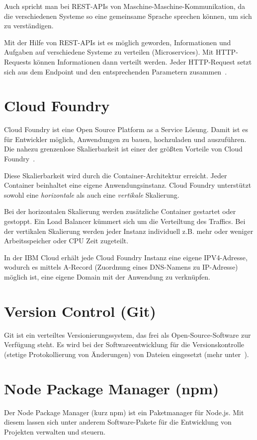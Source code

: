 Auch spricht man bei REST-APIs von Maschine-Maschine-Kommunikation, da die verschiedenen Systeme so eine gemeinsame
Sprache sprechen können, um sich zu verständigen.

Mit der Hilfe von REST-APIs ist es möglich geworden, Informationen und Aufgaben auf verschiedene Systeme zu verteilen
(Microservices). Mit HTTP-Requests können Informationen dann verteilt werden. Jeder HTTP-Request setzt sich aus dem
Endpoint und den entsprechenden Parametern zusammen~\cite{online_grundlagen_rest}.

\section{Cloud Foundry}
Cloud Foundry ist eine Open Source Platform as a Service Lösung. Damit ist es für Entwickler möglich, Anwendungen zu
bauen, hochzuladen und auszuführen. Die nahezu grenzenlose Skalierbarkeit ist einer der größten Vorteile von Cloud
Foundry~\cite{book_grundlagen_cloudfoundry}.

Diese Skalierbarkeit wird durch die Container-Architektur erreicht. Jeder Container beinhaltet eine eigene
Anwendungsinstanz. Cloud Foundry unterstützt sowohl eine \textit{horizontale} als auch eine \textit{vertikale}
Skalierung.

Bei der horizontalen Skalierung werden zusätzliche Container gestartet oder gestoppt. Ein Load Balancer kümmert sich um
die Verteiltung des Traffics. Bei der vertikalen Skalierung werden jeder Instanz individuell z.B. mehr oder weniger
Arbeitsspeicher oder CPU Zeit zugeteilt.

In der IBM Cloud erhält jede Cloud Foundry Instanz eine eigene IPV4-Adresse, wodurch es mittels A-Record (Zuordnung eines
DNS-Namens zu IP-Adresse) möglich ist, eine eigene Domain mit der Anwendung zu verknüpfen.

\section{Version Control (Git)}
Git ist ein verteiltes Versionierungssystem, das frei als Open-Source-Software zur Verfügung steht. Es wird bei der
Softwareentwicklung für die Versionskontrolle (stetige Protokollierung von Änderungen) von Dateien eingesetzt (mehr
unter~\cite{book_grundlagen_git}).

\section{Node Package Manager (npm)}
Der Node Package Manager (kurz npm) ist ein Paketmanager für Node.js. Mit diesem lassen sich unter anderem
Software-Pakete für die Entwicklung von Projekten verwalten und steuern.

